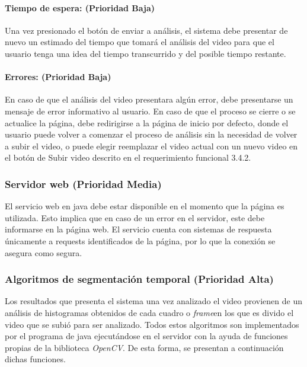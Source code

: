 \documentclass[a4paper]{article}
\begin{document}
{        \paragraph{Tiempo de espera: (Prioridad Baja)}
        	Una vez presionado el botón de enviar a análisis, el sistema debe presentar de nuevo un estimado del tiempo que tomará el análisis del video para que el usuario tenga una idea del tiempo transcurrido y del posible tiempo restante. \\
            
		\paragraph{Errores: (Prioridad Baja) }
        	En caso de que el análisis del video presentara algún error, debe presentarse un mensaje de error informativo al usuario. En caso de que el proceso se cierre o se actualice la página, debe redirigirse a la página de inicio por defecto, donde el usuario puede volver a comenzar el proceso de análisis sin la necesidad de volver a subir el video, o puede elegir reemplazar el video actual con un nuevo video en el botón de Subir video descrito en el requerimiento funcional 3.4.2.  \\
     
        \subsubsection{Servidor web (Prioridad Media) }
     	
        El servicio web en java debe estar disponible en el momento que la página es utilizada. Esto implica que en caso de un error en el servidor, este debe informarse en la página web. El servicio cuenta con sistemas de respuesta únicamente a requests identificados de la página, por lo que la conexión se asegura como segura. \\ 
            
        \subsubsection{Algoritmos de segmentación temporal (Prioridad Alta)}
      	
        Los resultados que presenta el sistema una vez analizado el video provienen de un análisis de histogramas  obtenidos de cada cuadro o \textit{frame}en los que es divido el video que se subió para ser analizado. Todos estos algoritmos son implementados por el programa de java ejecutándose en el servidor con la ayuda de funciones propias de la biblioteca \textit{OpenCV}. De esta forma, se presentan a continuación dichas funciones. \\
        
}
\end{document}
